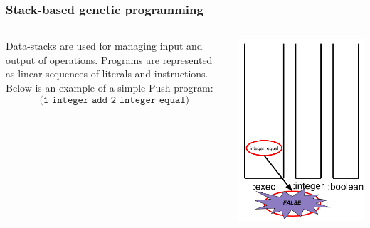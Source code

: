 \documentclass{beamer}
\newcommand{\linespace}{\vskip 0.25cm}
\begin{document}
\begin{frame}
	\frametitle{Stack-based genetic programming}
	\begin{columns}
		\begin{column}{0.65\textwidth}
			Data-stacks are used for managing input and output of operations.
			\linespace
			\linespace
			\linespace
			Programs are represented as linear sequences of literals and instructions. Below is an example of a simple Push program:
			\[\texttt{(1 integer\_add 2 integer\_equal)}\]
		\end{column}
		\begin{column}{0.35\textwidth}
			\includegraphics[height=.7\textheight]{Illustrations/stack_9.PDF}
		\end{column}
	\end{columns}
\end{frame}
\end{document}
